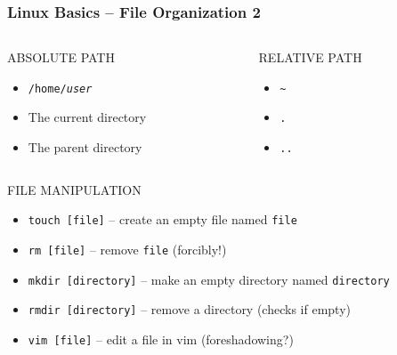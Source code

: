 \documentclass{beamer}
\begin{document}
\begin{frame}
  \frametitle{Linux Basics -- File Organization 2}
  \begin{columns}
    \begin{column}{.5\textwidth}
      ABSOLUTE PATH
      \begin{itemize}
        \item \texttt{/home/\emph{user}}
        \item The current directory
        \item The parent directory
      \end{itemize}
    \end{column}
    \begin{column}{.5\textwidth}
      RELATIVE PATH
      \begin{itemize}
        \item \texttt{\~}
        \item \texttt{.}
        \item \texttt{..}
      \end{itemize}
    \end{column}
  \end{columns}
  \vspace{1em}
  \begin{center}
    FILE MANIPULATION
  \end{center}
  \vspace{-1em}
  \begin{itemize}
    \item \texttt{touch [file]} -- create an empty file named \texttt{file}
    \item \texttt{rm [file]}  -- remove \texttt{file} (forcibly!)
    \item \texttt{mkdir [directory]} -- make an empty directory named \texttt{directory}
    \item \texttt{rmdir [directory]} -- remove a directory (checks if empty)
    \item \texttt{vim [file]} -- edit a file in vim (foreshadowing?)
  \end{itemize}
\end{frame}
\end{document}
